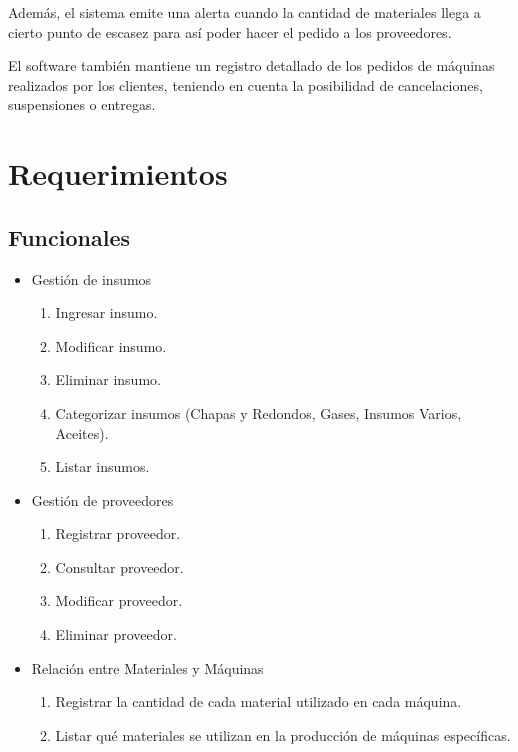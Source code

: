 \documentclass{article}
\begin{document}
	   Además, el sistema emite una alerta cuando la cantidad de materiales llega a cierto punto de escasez para así poder hacer el pedido a los proveedores.
	
	   El software también mantiene un registro detallado de los pedidos de máquinas realizados por los clientes, teniendo en cuenta la posibilidad de cancelaciones, suspensiones o entregas.

\section{Requerimientos}
\subsection{Funcionales}

\begin{itemize}
	\item Gestión de insumos
	\begin{enumerate}
		\item Ingresar insumo.
		\item Modificar insumo.
		\item Eliminar insumo.
		\item Categorizar insumos (Chapas y Redondos, Gases, Insumos Varios, Aceites).
		\item Listar insumos.
	\end{enumerate}
\end{itemize}

\begin{itemize}
	\item Gestión de proveedores
	\begin{enumerate}[start=6]
		\item Registrar proveedor.
		\item Consultar proveedor.
		\item Modificar proveedor.
		\item Eliminar proveedor.
	\end{enumerate}
\end{itemize}

\begin{itemize}
	\item Relación entre Materiales y Máquinas
	\begin{enumerate}[start=10]
		\item Registrar la cantidad de cada material utilizado en cada máquina.
		\item Listar qué materiales se utilizan en la producción de máquinas específicas.
	\end{enumerate}
\end{itemize}
\end{document}
